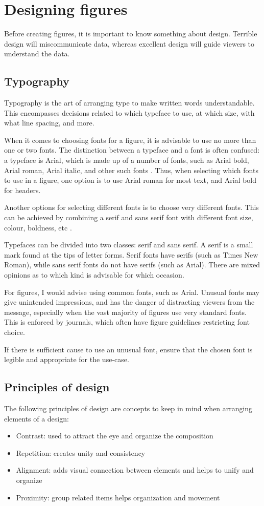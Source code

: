 \documentclass[letterpaper]{article}
\begin{document}
\section{Designing figures}
Before creating figures, it is important to know something about design. Terrible design will miscommunicate data, whereas excellent design will guide viewers to understand the data\cite{tufte}. 

\subsection{Typography}
Typography is the art of arranging type to make written words understandable. This encompasses decisions related to which typeface to use, at which size, with what line spacing, and more. 

When it comes to choosing fonts for a figure, it is advisable to use no more than one or two fonts. The distinction between a typeface and a font is often confused: a typeface is Arial, which is made up of a number of fonts, such as Arial bold, Arial roman, Arial italic, and other such fonts \cite{wong-type}. Thus, when selecting which fonts to use in a figure, one option is to use Arial roman for most text, and Arial bold for headers.

Another options for selecting different fonts is to choose very different fonts. This can be achieved by combining a serif and sans serif font with different font size, colour, boldness, etc \cite{williams}.

Typefaces can be divided into two classes: serif and \textsf{sans serif}. A serif is a small mark found at the tips of letter forms. Serif fonts have serifs (such as Times New Roman), while \textsf{sans serif} fonts do not have serifs (such as Arial). There are mixed opinions as to which kind is advisable for which occasion.

For figures, I would advise using common fonts, such as Arial. Unusual fonts may give unintended impressions, and has the danger of distracting viewers from the message, especially when the vast majority of figures use very standard fonts. This is enforced by journals, which often have figure guidelines restricting font choice. 

If there is sufficient cause to use an unusual font, ensure that the chosen font is legible and appropriate for the use-case. 

\subsection{Principles of design}
The following principles of design are concepts to keep in mind when arranging elements of a design: \cite{williams}
\begin{itemize}
\item Contrast: used to attract the eye and organize the composition
\item Repetition: creates unity and consistency
\item Alignment: adds visual connection between elements and helps to unify and organize
\item Proximity: group related items helps organization and movement
\end{itemize}
\end{document}

